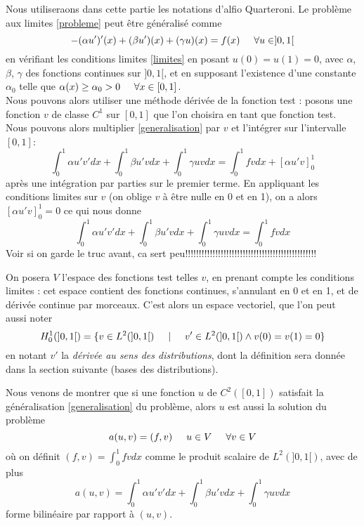 \documentclass[12pt]{article}
\newcommand{\espace}{\hspace{5mm}}
\begin{document}
Nous utiliseraons dans cette partie les notations d'alfio Quarteroni. Le problème aux limites \eqref{probleme} peut être généralisé comme
\begin{equation} \label{generalisation}
-(\alpha u')'(x) + (\beta u')(x) + (\gamma u)(x) = f(x) \espace \forall u \in ]0,1[
\end{equation}
en vérifiant les conditions limites \eqref{limites} en posant $u(0) = u(1) = 0$, avec $\alpha$, $\beta$, $\gamma$ des fonctions continues sur $]0,1[$, et en supposant l'existence d'une constante $\alpha_0$ telle que $\alpha(x) \ge \alpha_0 > 0 \espace \forall x \in [0,1]$. \\
\quad Nous pouvons alors utiliser une méthode dérivée de la fonction test : posons une fonction $v$ de classe $C^1$ sur $[0,1]$ que l'on choisira en tant que fonction test. Nous pouvons alors multiplier \eqref{generalisation} par $v$ et l'intégrer sur l'intervalle $[0,1]$:
\begin{equation} \label{patéIntegrale}
\int_0^1 \alpha u' v' dx + \int_0^1 \beta u' v dx + \int_0^1 \gamma u v dx = \int_0^1 fv dx + [\alpha u' v]_0^1
\end{equation}
après une intégration par parties sur le premier terme. En appliquant les conditions limites sur $v$ (on oblige $v$ à être nulle en 0 et en 1), on a alors $[\alpha u' v]_0^1 = 0$ ce qui nous donne
\begin{equation}
\int_0^1 \alpha u' v' dx + \int_0^1 \beta u' v dx + \int_0^1 \gamma u v dx = \int_0^1 fv dx 
\end{equation}
Voir si on garde le truc avant, ca sert peu!!!!!!!!!!!!!!!!!!!!!!!!!!!!!!!!!!!!!!!!!!!!!!!!

On posera $V$ l'espace des fonctions test telles $v$, en prenant compte les conditions limites : cet espace contient des fonctions continues, s'annulant en 0 et en 1, et de dérivée continue par morceaux. C'est alors un espace vectoriel, que l'on peut aussi noter 
\begin{equation}
H_0^1(]0,1[) = \{v \in L^2(]0,1[) \espace | \espace v' \in L^2(]0,1[) \wedge v(0) = v(1) = 0\}
\end{equation}
en notant $v'$ la \emph{dérivée au sens des distributions}, dont la définition sera donnée dans la section suivante (bases des distributions).

Nous venons de montrer que si une fonction $u$ de $C^2([0,1])$ satisfait la généralisation \eqref{generalisation} du problème, alors $u$ est aussi la solution du problème
\begin{equation} \label{problemeSecondaire}
a(u,v) = (f,v) \espace u \in V \espace \forall v \in V
\end{equation}
où on définit $(f,v) = \int_0^1 fv dx$ comme le produit scalaire de $L^2(]0,1[)$, avec de plus
\begin{equation}
a(u,v) = \int_0^1 \alpha u' v' dx + \int_0^1 \beta u' v dx + \int_0^1 \gamma u v dx
\end{equation}
forme bilinéaire par rapport à $(u,v)$.
\end{document}
